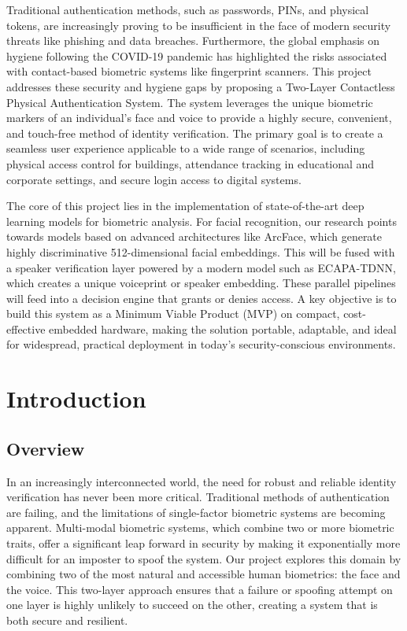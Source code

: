 \documentclass[12pt, a4paper]{article}
\begin{document}
Traditional authentication methods, such as passwords, PINs, and physical tokens, are increasingly proving to be insufficient in the face of modern security threats like phishing and data breaches. Furthermore, the global emphasis on hygiene following the COVID-19 pandemic has highlighted the risks associated with contact-based biometric systems like fingerprint scanners. This project addresses these security and hygiene gaps by proposing a Two-Layer Contactless Physical Authentication System. The system leverages the unique biometric markers of an individual's face and voice to provide a highly secure, convenient, and touch-free method of identity verification. The primary goal is to create a seamless user experience applicable to a wide range of scenarios, including physical access control for buildings, attendance tracking in educational and corporate settings, and secure login access to digital systems.

The core of this project lies in the implementation of state-of-the-art deep learning models for biometric analysis. For facial recognition, our research points towards models based on advanced architectures like ArcFace, which generate highly discriminative 512-dimensional facial embeddings. This will be fused with a speaker verification layer powered by a modern model such as ECAPA-TDNN, which creates a unique voiceprint or speaker embedding. These parallel pipelines will feed into a decision engine that grants or denies access. A key objective is to build this system as a Minimum Viable Product (MVP) on compact, cost-effective embedded hardware, making the solution portable, adaptable, and ideal for widespread, practical deployment in today's security-conscious environments.

\section{Introduction}

\subsection{Overview}
In an increasingly interconnected world, the need for robust and reliable identity verification has never been more critical. Traditional methods of authentication are failing, and the limitations of single-factor biometric systems are becoming apparent. Multi-modal biometric systems, which combine two or more biometric traits, offer a significant leap forward in security by making it exponentially more difficult for an imposter to spoof the system. Our project explores this domain by combining two of the most natural and accessible human biometrics: the face and the voice. This two-layer approach ensures that a failure or spoofing attempt on one layer is highly unlikely to succeed on the other, creating a system that is both secure and resilient.
\end{document}

